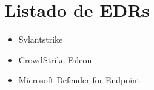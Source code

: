 \section{Listado de EDRs}

\begin{itemize}
    \item Sylantstrike
    \item CrowdStrike Falcon
    \item Microsoft Defender for Endpoint
\end{itemize}